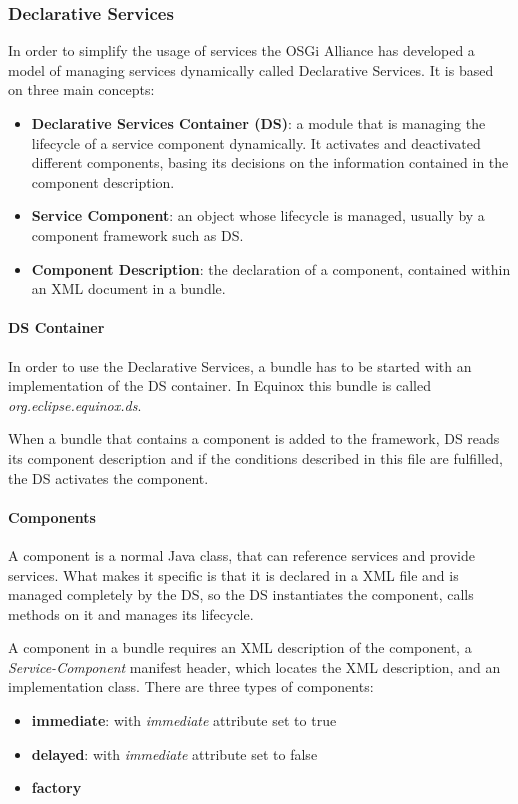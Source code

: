 \subsubsection{Declarative Services}
In order to simplify the usage of services the OSGi Alliance has developed a model of managing services dynamically called Declarative
Services. It is based on three main concepts:

\begin{itemize}
	\item \textbf{Declarative Services Container (DS)}: a module that is managing the lifecycle of a service component dynamically.
	It activates and deactivated different components, basing its decisions on the information contained in the component description.
	\item \textbf{Service Component}: an object whose lifecycle is managed, usually by a component framework such as DS.
	\item \textbf{Component Description}: the declaration of a component, contained within an XML document in a bundle.
\end{itemize}

\paragraph{DS Container}
In order to use the Declarative Services, a bundle has to be started with an implementation of the DS container. In Equinox this
bundle is called \textit{org.eclipse.equinox.ds}.

When a bundle that contains a component is added to the framework, DS reads its component description and if the conditions
described in this file are fulfilled, the DS activates the component.

\paragraph{Components}
A component is a normal Java class, that can reference services and provide services. What makes it specific is that it is declared
in a XML file and is managed completely by the DS, so the DS instantiates the component, calls methods on it and manages its
lifecycle.

A component in a bundle requires an XML description of the component, a \textit{Service-Component} manifest header, which locates
the XML description, and an implementation class. There are three types of components:
\begin{itemize}
	\item \textbf{immediate}: with \textit{immediate} attribute set to true
	\item \textbf{delayed}: with \textit{immediate} attribute set to false
	\item \textbf{factory}
\end{itemize}


